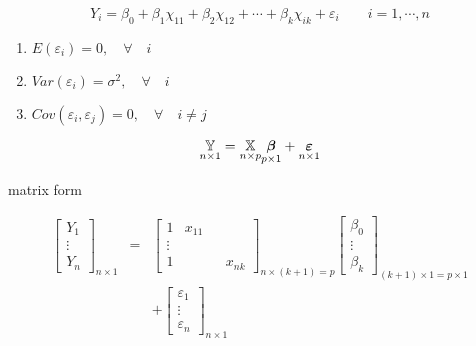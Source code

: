 \documentclass{article}
\begin{document}
\setcounter{part}{1} \setcounter{page}{1}

\begin{equation*}
Y_{i}=\beta _{0}+\beta _{1}\chi _{11}+\beta _{2}\chi _{12}+\cdots +\beta
_{k}\chi _{ik}+\varepsilon _{i}\qquad i=1,\cdots ,n
\end{equation*}

\begin{enumerate}
\item $E\left( \varepsilon _{i}\right) =0,\quad \forall \quad i$

\item $Var\left( \varepsilon _{i}\right) =\sigma ^{2},\quad \forall \quad i$

\item $Cov\left( \varepsilon _{i},\varepsilon _{j}\right) =0,\quad \forall
\quad i\neq j$
\end{enumerate}

\begin{equation*}
\underset{n\times 1}{\mathbb{Y}}=\underset{n\times p}{\mathbb{X}}\underset{%
p\times 1}{\mathbf{\beta }}+\underset{n\times 1}{\mathbf{\varepsilon }}
\end{equation*}

matrix form

\begin{eqnarray*}
\left[ 
\begin{array}{c}
Y_{1} \\ 
\vdots \\ 
Y_{n}%
\end{array}%
\right] _{n\times 1} &=&\left[ 
\begin{array}{cccc}
1 & x_{11} &  &  \\ 
\vdots &  &  &  \\ 
1 &  &  & x_{nk}%
\end{array}%
\right] _{n\times \left( k+1\right) =p}\left[ 
\begin{array}{c}
\beta _{0} \\ 
\vdots \\ 
\beta _{k}%
\end{array}%
\right] _{\left( k+1\right) \times 1=p\times 1} \\
&&+\left[ 
\begin{array}{c}
\varepsilon _{1} \\ 
\vdots \\ 
\varepsilon _{n}%
\end{array}%
\right] _{n\times 1}
\end{eqnarray*}
\end{document}

